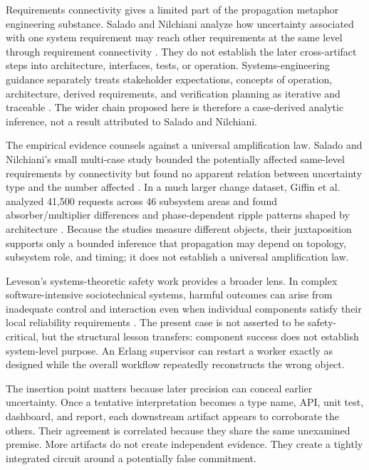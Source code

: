 \documentclass[10pt,a4paper]{article}
\begin{document}
Requirements connectivity gives a limited part of the propagation metaphor engineering substance. Salado and Nilchiani analyze how uncertainty associated with one system requirement may reach other requirements at the same level through requirement connectivity \cite{salado2013}. They do not establish the later cross-artifact steps into architecture, interfaces, tests, or operation. Systems-engineering guidance separately treats stakeholder expectations, concepts of operation, architecture, derived requirements, and verification planning as iterative and traceable \cite{nasase2017}. The wider chain proposed here is therefore a case-derived analytic inference, not a result attributed to Salado and Nilchiani.

The empirical evidence counsels against a universal amplification law. Salado and Nilchiani's small multi-case study bounded the potentially affected same-level requirements by connectivity but found no apparent relation between uncertainty type and the number affected \cite{salado2013}. In a much larger change dataset, Giffin et al. analyzed 41,500 requests across 46 subsystem areas and found absorber/multiplier differences and phase-dependent ripple patterns shaped by architecture \cite{giffin2009}. Because the studies measure different objects, their juxtaposition supports only a bounded inference that propagation may depend on topology, subsystem role, and timing; it does not establish a universal amplification law.

Leveson's systems-theoretic safety work provides a broader lens. In complex software-intensive sociotechnical systems, harmful outcomes can arise from inadequate control and interaction even when individual components satisfy their local reliability requirements \cite{leveson2012}. The present case is not asserted to be safety-critical, but the structural lesson transfers: component success does not establish system-level purpose. An Erlang supervisor can restart a worker exactly as designed while the overall workflow repeatedly reconstructs the wrong object.

The insertion point matters because later precision can conceal earlier uncertainty. Once a tentative interpretation becomes a type name, API, unit test, dashboard, and report, each downstream artifact appears to corroborate the others. Their agreement is correlated because they share the same unexamined premise. More artifacts do not create independent evidence. They create a tightly integrated circuit around a potentially false commitment.
\end{document}

